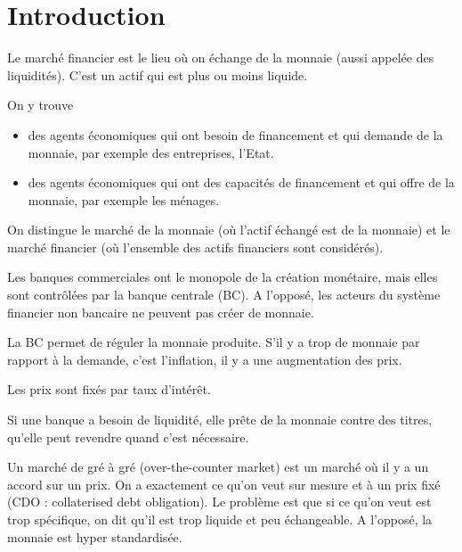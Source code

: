 \chapter{Introduction}

Le marché financier est le lieu où on échange de la monnaie (aussi appelée des liquidités). C'est un actif qui est plus ou moins liquide.

On y trouve

\begin{itemize}
	\item des agents économiques qui ont besoin de financement et qui demande de la monnaie, par exemple des entreprises, l'Etat.
	\item des agents économiques qui ont des capacités de financement et qui offre de la monnaie, par exemple les ménages.
\end{itemize}

On distingue le marché de la monnaie (où l'actif échangé est de la monnaie) et le marché financier (où l'ensemble des actifs financiers sont considérés).


Les banques commerciales ont le monopole de la création monétaire, mais elles sont contrôlées par la banque centrale (BC). A l'opposé, les acteurs du système financier non bancaire ne peuvent pas créer de monnaie.

La BC permet de réguler la monnaie produite. S'il y a trop de monnaie par rapport à la demande, c'est l'inflation, il y a une augmentation des prix.

Les prix sont fixés par taux d'intérêt.

Si une banque a besoin de liquidité, elle prête de la monnaie contre des titres, qu'elle peut revendre quand c'est nécessaire.

Un marché de gré à gré (over-the-counter market) est un marché où il y a un accord sur un prix. On a exactement ce qu'on veut sur mesure et à un prix fixé (CDO : collaterised debt obligation). Le problème est que si ce qu'on veut est trop spécifique, on dit qu'il est trop liquide et peu échangeable. A l'opposé, la monnaie est hyper standardisée.